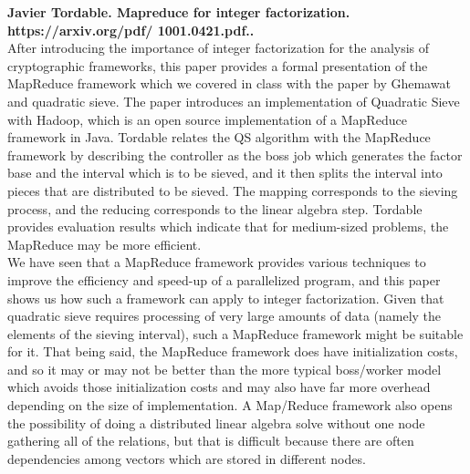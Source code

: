 \documentclass[11pt,twocolumn]{article}
\begin{document}
\textbf{Javier Tordable. Mapreduce for integer
factorization.
https://arxiv.org/pdf/
1001.0421.pdf..} \\

After introducing the importance of integer factorization for the analysis of cryptographic frameworks, this paper provides a formal presentation of the MapReduce framework which we covered in class with the paper by Ghemawat and quadratic sieve. The paper introduces an implementation of Quadratic Sieve with Hadoop, which is an open source implementation of a MapReduce framework in Java. Tordable relates the QS algorithm with the MapReduce framework by describing the controller as the boss job which generates the factor base and the interval which is to be sieved, and it then splits the interval into pieces that are distributed to be sieved. The mapping corresponds to the sieving process, and the reducing corresponds to the linear algebra step. Tordable provides evaluation results which indicate that for medium-sized problems, the MapReduce may be more efficient. \\
\indent We have seen that a MapReduce framework provides various techniques to improve the efficiency and speed-up of a parallelized program, and this paper shows us how such a framework can apply to integer factorization. Given that quadratic sieve requires processing of very large amounts of data (namely the elements of the sieving interval), such a MapReduce framework might be suitable for it. That being said, the MapReduce framework does have initialization costs, and so it may or may not be better than the more typical boss/worker model which avoids those initialization costs and may also have far more overhead depending on the size of implementation. A Map/Reduce framework also opens the possibility of doing a distributed linear algebra solve without one node gathering all of the relations, but that is difficult because there are often dependencies among vectors which are stored in different nodes. \\
\end{document}
